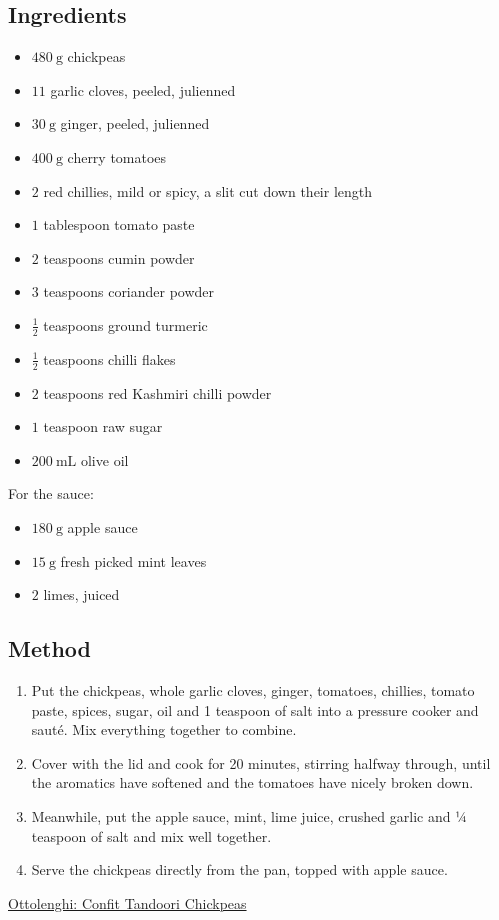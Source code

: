 \documentclass[11pt,a4paper]{article}
\begin{document}
\subsection*{Ingredients}

\begin{multicols}{2}

\begin{itemize}
  \item $ \qty{480}{\gram} $ chickpeas
  \item $ 11 $ garlic cloves, peeled, julienned
  \item $ \qty{30}{\gram} $ ginger, peeled, julienned
  \item $ \qty{400}{\gram} $ cherry tomatoes
  \item $ 2 $ red chillies, mild or spicy, a slit cut down their length
  \item $ 1 $ tablespoon tomato paste
  \item $ 2 $ teaspoons cumin powder
  \item $ 3 $ teaspoons coriander powder
  \item $ \frac {1}{2} $ teaspoons ground turmeric
  \item $ \frac {1}{2} $ teaspoons chilli flakes
  \item $ 2 $ teaspoons red Kashmiri chilli powder
  \item $ 1 $ teaspoon raw sugar
  \item $ \qty{200}{\mL} $ olive oil
\end{itemize}

\columnbreak{}

For the sauce:

\begin{itemize}
  \item $ \qty{180}{\gram} $ apple sauce
  \item $ \qty{15}{\gram} $ fresh picked mint leaves
  \item $ 2 $ limes, juiced
\end{itemize}

\end{multicols}

\medskip

\subsection*{Method}

\begin{enumerate}
  \item Put the chickpeas, whole garlic cloves, ginger, tomatoes, chillies,
  tomato paste, spices, sugar, oil and 1 teaspoon of salt into a  pressure
  cooker and sauté. Mix everything together to combine.
  \item Cover with the lid and cook for 20 minutes, stirring halfway through,
  until the aromatics have softened and the tomatoes have nicely broken down.
  \item Meanwhile, put the apple sauce, mint, lime juice, crushed garlic and
  1⁄4 teaspoon of salt and mix well together.
  \item Serve the chickpeas directly from the pan, topped with apple sauce.
\end{enumerate}

\href{https://ottolenghi.co.uk/pages/recipes/confit-tandoori-chickpeas}{Ottolenghi: Confit Tandoori Chickpeas}
\end{document}
